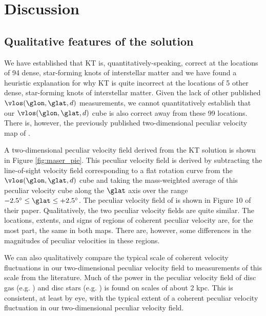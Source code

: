 \section{Discussion}
\label{sec:discussion}
\subsection{Qualitative features of the solution}
\label{sec:discussion-qualitative}
We have established that KT is, quantitatively-speaking, correct at the locations of 94 dense, star-forming knots of interstellar matter and we have found a heuristic explanation for why KT is quite incorrect at the locations of 5 other dense, star-forming knots of interstellar matter.
Given the lack of other published $\vlos(\glon, \glat, d)$ measurements, we cannot quantitatively establish that our $\vlos(\glon, \glat, d)$ cube is also correct away from these 99 locations.
There is, however, the previously published two-dimensional peculiar velocity map of \citet{1993A&A...275...67B}.

A two-dimensional peculiar velocity field derived from the KT solution is shown in Figure \ref{fig:maser_pie}.
This peculiar velocity field is derived by subtracting the line-of-sight velocity field corresponding to a flat rotation curve from the $\vlos(\glon, \glat, d)$ cube and taking the mass-weighted average of this peculiar velocity cube along the $\glat$ axis over the range $-2.5^\circ \leq \glat \leq +2.5^\circ$.
The peculiar velocity field of \citet{1993A&A...275...67B} is shown in Figure 10 of their paper. 
Qualitatively, the two peculiar velocity fields are quite similar. 
The locations, extents, and signs of regions of coherent peculiar velocity are, for the most part, the same in both maps. 
There are, however, some differences in the magnitudes of peculiar velocities in these regions.

We can also qualitatively compare the typical scale of coherent velocity fluctuations in our two-dimensional peculiar velocity field to measurements of this scale from the literature. 
Much of the power in the peculiar velocity field of disc gas (e.g. \citealt{Clemens_1985}) and disc stars (e.g. \citealt{2015ApJ...800...83B}) is found on scales of about 2 kpc.
This is consistent, at least by eye, with the typical extent of a coherent peculiar velocity fluctuation in our two-dimensional peculiar velocity field.

